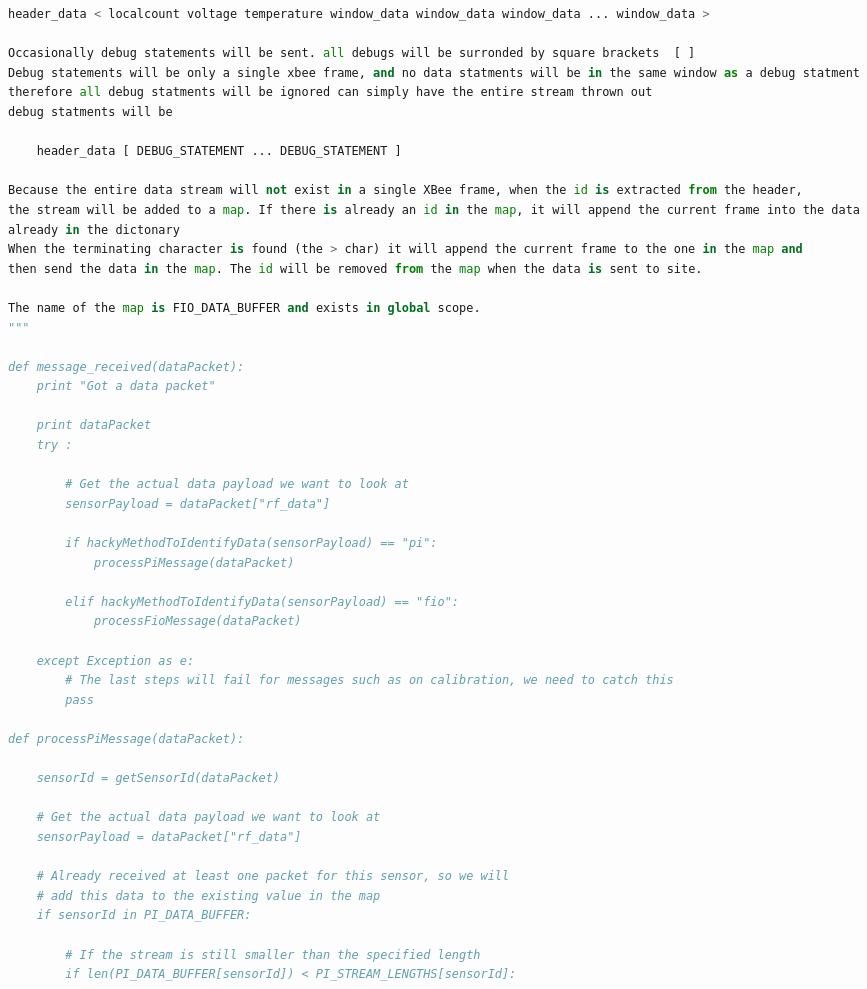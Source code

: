\documentclass[11pt, oneside, fullpage, doublespace]{article}
\begin{document}
\begin{spacing}{1}
\begin{lstlisting}[language=python]
	header_data < localcount voltage temperature window_data window_data window_data ... window_data >

Occasionally debug statements will be sent. all debugs will be surronded by square brackets  [ ] 
Debug statements will be only a single xbee frame, and no data statments will be in the same window as a debug statment
therefore all debug statments will be ignored can simply have the entire stream thrown out
debug statments will be

	header_data [ DEBUG_STATEMENT ... DEBUG_STATEMENT ]

Because the entire data stream will not exist in a single XBee frame, when the id is extracted from the header,
the stream will be added to a map. If there is already an id in the map, it will append the current frame into the data
already in the dictonary
When the terminating character is found (the > char) it will append the current frame to the one in the map and 
then send the data in the map. The id will be removed from the map when the data is sent to site. 

The name of the map is FIO_DATA_BUFFER and exists in global scope.
"""

def message_received(dataPacket):
	print "Got a data packet"

	print dataPacket
	try :
		
		# Get the actual data payload we want to look at
		sensorPayload = dataPacket["rf_data"]

		if hackyMethodToIdentifyData(sensorPayload) == "pi":
			processPiMessage(dataPacket)

		elif hackyMethodToIdentifyData(sensorPayload) == "fio":
			processFioMessage(dataPacket)
	
	except Exception as e:
		# The last steps will fail for messages such as on calibration, we need to catch this
		pass	

def processPiMessage(dataPacket):

	sensorId = getSensorId(dataPacket)

	# Get the actual data payload we want to look at
	sensorPayload = dataPacket["rf_data"]	

	# Already received at least one packet for this sensor, so we will
	# add this data to the existing value in the map
	if sensorId in PI_DATA_BUFFER:

		# If the stream is still smaller than the specified length
		if len(PI_DATA_BUFFER[sensorId]) < PI_STREAM_LENGTHS[sensorId]:
			

\end{lstlisting}
\end{spacing}
\end{document}

